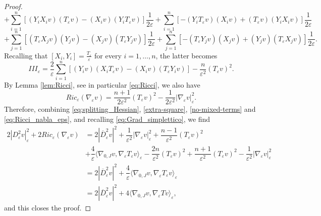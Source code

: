 \documentclass[10pt]{amsart}
\numberwithin{equation}{section}
\theoremstyle{definition}
\begin{document}
\begin{proof}
	\[ +\sum_{i=1}^n  \left[ (Y_i X_i v)( T_\varepsilon v)    -(X_i v) (Y_i T_\varepsilon v) \right] \frac{1}{2\varepsilon} +\sum_{i=1}^n   \left[ -(Y_i T_\varepsilon v)(X_iv)    +(T_\varepsilon v) (Y_iX_iv) \right] \frac{1}{2\varepsilon} \]
	\[  + \sum_{j=1}^{n}  \left[ (T_\varepsilon X_j v)(Y_jv)    -(X_j v) (T_\varepsilon Y_j v) \right] \frac{1}{2\varepsilon}   + \sum_{j=1}^{n}  \left[ -(T_\varepsilon Y_j v)(X_j v)    +(Y_j v) (T_\varepsilon X_j v) \right] \frac{1}{2\varepsilon}. \]
	Recalling that $[X_i,Y_i]=\tfrac{T_\varepsilon}{\varepsilon}$ for every $i=1,\ldots,n$, the latter becomes
	\begin{equation}\label{no-mixed-terms}
		III_{\varepsilon} = \dfrac{2}{\varepsilon} \sum_{i=1}^{n}\left[(Y_iv)(X_i T_{\varepsilon}v) - (X_i v)(T_{\varepsilon}Y_i v)\right] - \dfrac{n}{\varepsilon^2}(T_{\varepsilon}v)^2.
	\end{equation}
	By Lemma \ref{lem:Ricci}, see in particular \eqref{eq:Ricci}, we also have
	\begin{equation}\label{eq:Ricci_nabla_eps}
		Ric_{\varepsilon}(\nabla_{\varepsilon}v) = \dfrac{n+1}{2\varepsilon^2}(T_{\varepsilon}v)^{2} - \dfrac{1}{2\varepsilon^2}|\nabla_{\varepsilon}v|_{\varepsilon}^{2}.
	\end{equation}
	Therefore, combining \eqref{eq:splitting_Hessian}, \eqref{extra-square}, \eqref{no-mixed-terms} and \eqref{eq:Ricci_nabla_eps}, and recalling \eqref{eq:Grad_simplettico}, we find
	\begin{equation*}
		\begin{aligned}
			2|D^2_\varepsilon v |_\varepsilon^2 +2 Ric_\varepsilon(\nabla_\varepsilon v) &= 2|\overline{D}^2_\varepsilon v |^2 + \dfrac{1}{\varepsilon^2}|\nabla_{\varepsilon}v|^{2}_{\varepsilon} + \dfrac{n-1}{\varepsilon^2}(T_{\varepsilon}v)^2 \\
			&+ \dfrac{4}{\varepsilon}\langle \nabla_{0,J}v, \nabla_{\varepsilon}T_{\varepsilon}v\rangle_{\varepsilon} -\dfrac{2n}{\varepsilon^2}(T_{\varepsilon}v)^2 + \dfrac{n+1}{\varepsilon^2}(T_{\varepsilon}v)^{2} - \dfrac{1}{\varepsilon^2}|\nabla_{\varepsilon}v|_{\varepsilon}^{2} \\
			&=2|\overline{D}^2_{\varepsilon}v|^2 + \dfrac{4}{\varepsilon} \langle \nabla_{0,J}v, \nabla_{\varepsilon}T_{\varepsilon}v \rangle_{\varepsilon}\\
			&=2|\overline{D}^2_{\varepsilon}v|^2 + 4 \langle \nabla_{0,J}v, \nabla_{\varepsilon}T v \rangle_{\varepsilon},
		\end{aligned}
	\end{equation*}
	\noindent and this closes the proof.
\end{proof}	
\end{document}
